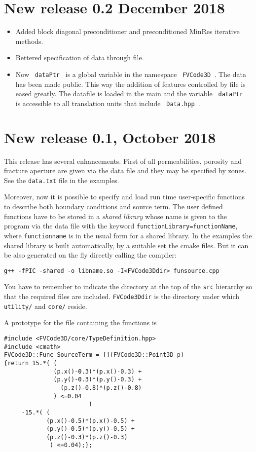 \documentclass{article}
\newcommand{\li}{\lstinline}
\newcommand{\cpp}[1]{\li! #1 !}
\begin{document}
\section{New release 0.2 December 2018}

\begin{itemize}
\item Added block diagonal preconditioner and preconditioned MinRes iterative methods. 
\item Bettered specification of data through file.
\item Now \cpp{dataPtr} is a global variable in the namespace \cpp{FVCode3D}. The data has been made public. This way the addition of features controlled by file is eased greatly. The datafile is loaded in the main and the variable \cpp{dataPtr} is accessible to all translation units that include \cpp{Data.hpp}.
\end{itemize}
\section{New release 0.1, October 2018}
This release has several enhancements. First of all permeabilities, porosity and fracture aperture  are given 
via the data file and they may be specified by zones. See the \li!data.txt! file in the examples.

Moreover, now it is possible to specify and load run time user-specific functions to describe both boundary conditions and source term.
The user defined functions have to be stored in a \emph{shared library} whose name is given to the program via the data file with the keyword
\li!functionLibrary=functionName!, where \li!functionname! is in the usual form for a shared library. In the examples the shared library is built automatically, by a suitable set the cmake files. But it can be also generated on the fly directly calling the compiler:

\begin{verbatim}
g++ -fPIC -shared -o libname.so -I<FVCode3Ddir> funsource.cpp
\end{verbatim}

You have to remember to indicate the directory at the top of the \li!src! hierarchy so that the required files are included. \li!FVCode3Ddir! is the directory under which \li!utility/! and \li!core/! reside.

A prototype for the file containing the functions is

\begin{lstlisting}
#include <FVCode3D/core/TypeDefinition.hpp>
#include <cmath>
FVCode3D::Func SourceTerm = [](FVCode3D::Point3D p)
{return 15.*( (
              (p.x()-0.3)*(p.x()-0.3) +
              (p.y()-0.3)*(p.y()-0.3) +
                (p.z()-0.8)*(p.z()-0.8)
              ) <=0.04
                        )
     -15.*( (
            (p.x()-0.5)*(p.x()-0.5) +
            (p.y()-0.5)*(p.y()-0.5) +
            (p.z()-0.3)*(p.z()-0.3)
             ) <=0.04);};
\end{lstlisting}
\end{document}
